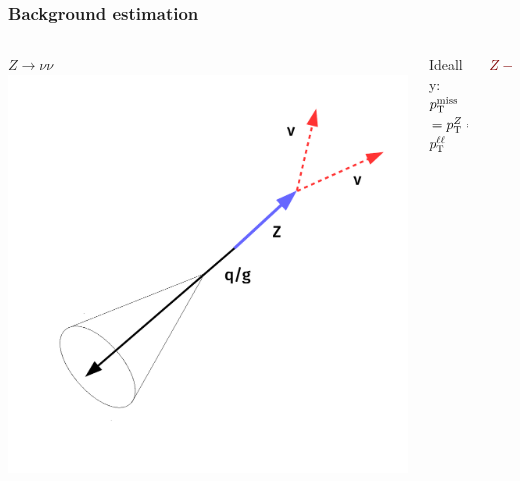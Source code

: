 \documentclass[aspectratio=169,xcolor=dvipsnames,,table,compress]{beamer}
\begin{document}
\begin{frame}[t]  \frametitle{Background estimation}
  \begin{columns}
  \begin{column}{0.33\textwidth}
    \centering
    \textcolor{mygrey}{$Z\rightarrow\nu\nu$} \\
    \includegraphics[width=\textwidth]{../figures/talk/zsr.pdf}
  \end{column}
  \begin{column}{0.34\textwidth}
    \centering
    Ideally: \\
    {\Large \textcolor{mygrey}{$p_\text{T}^\text{miss}$}$ \,= p_\text{T}^Z =\,$\textcolor{maroon}{$ p_\text{T}^{\ell\ell}  $}} \\
    \vspace{5mm}
  \end{column}
  \begin{column}{0.33\textwidth}
    \centering
    \textcolor{maroon}{$Z\rightarrow\ell\ell$} \\

\end{column}
\end{columns}
\end{frame}
\end{document}
